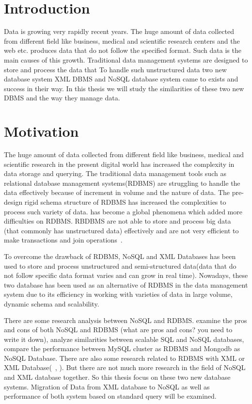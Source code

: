\section{Introduction}
Data is growing very rapidly recent years. The huge amount of data collected from different field like business, medical and scientific research centers and the web etc. produces data that do not follow the specified format. Such data  is the main causes of this growth. Traditional data management systems are designed to store and process the data that To handle such unstructured data two new database system XML DBMS and NoSQL database system came to exists and success in their way. In this thesis we will study the similarities of these two new DBMS and the way they manage data. 

\section{Motivation}
		\label{motivation}
			The huge amount of data collected from different field like business, medical and scientific research in the present digital world has increased the complexity in data storage and querying. The traditional data management tools such as relational database management systems(RDBMS) are struggling to handle the data effectively  because of increment in  volume and the nature of data. The   pre-design rigid schema structure of RDBMS  has increased the complexities to process such variety of data.  has become a global phenomena which added more difficulties on RDBMS. RBDBMS are not able to store and process big data (that commonly has unstructured data) effectively and are not very efficient to make transactions and join operations~\citep{abramova2013nosql}.
			
			To overcome the drawback of RDBMS, NoSQL and  XML Databases has been used to store and process unstructured and semi-structured data(data that do not follow specific data format varies and can grow in real time). Nowadays, these two database has been used as an alternative of RDBMS in the data management system due to its efficiency in working with varieties of data in large volume, dynamic schema and scalability.
			
			There are some research analysis between NoSQL and RDBMS. \cite{nance2013nosql} examine the pros and cons of both NoSQL and RDBMS (what are pros and cons? you need to write it down), \cite{cattell2011scalable} analyze similarities between scalable SQL and NoSQL databases, \cite{hadjigeorgiou2013rdbms}  compare the performance between MySQL cluster as RDBMS and Mongodb as NoSQL Database.  There are also some research related to RDBMS with XML or XML Database(~\citet{jiang2002xparent}, \citet{shanmugasundaram1999relational}). But there are not much more research in the field of NoSQL and XML database together. So this thesis focus on these two new database systems. Migration of Data from XML database to NoSQL as well as performance of both system based on standard query will be examined.	

